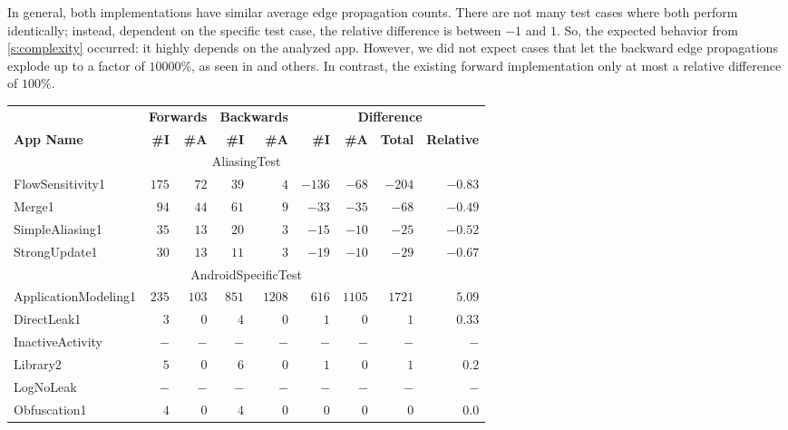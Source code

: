 \documentclass[../draft.tex]{subfiles}
\begin{document}
    In general, both implementations have similar average edge propagation counts. There are not many test cases where both perform identically; instead, dependent on the specific test case, the relative difference is between $-1$ and $1$. So, the expected behavior from \autoref{s:complexity} occurred: it highly depends on the analyzed app.
    However, we did not expect cases that let the backward edge propagations explode up to a factor of $10 000\%$, as seen in  and others. In contrast, the existing forward implementation only at most a relative difference of $100\%$.

    \footnotesize
    \newcommand{\tsubEight}[1]{\multicolumn{9}{c}{#1}\\\hline}
    \begin{longtable}{l | r | r | r | r | r | r | r | r}
        \centering
        & \multicolumn{2}{c|}{\textbf{Forwards}} & \multicolumn{2}{c|}{\textbf{Backwards}} & \multicolumn{4}{c}{\textbf{Difference}}\\
        \textbf{App Name} & \textbf{\#I} & \textbf{\#A} & \textbf{\#I} & \textbf{\#A} & \textbf{\#I} & \textbf{\#A}& \textbf{Total} & \textbf{Relative}\\
        \hline\hline
        \endhead
        \hline
        \tsubEight{AliasingTest}
        FlowSensitivity1 & $175$ & $72$ & $39$ & $4$ & $-136$ & $-68$ & $-204$ & $-0.83$\\
        Merge1 & $94$ & $44$ & $61$ & $9$ & $-33$ & $-35$ & $-68$ & $-0.49$\\
        SimpleAliasing1 & $35$ & $13$ & $20$ & $3$ & $-15$ & $-10$ & $-25$ & $-0.52$\\
        StrongUpdate1 & $30$ & $13$ & $11$ & $3$ & $-19$ & $-10$ & $-29$ & $-0.67$\\
        \hline
        \tsubEight{AndroidSpecificTest}
        ApplicationModeling1 & $235$ & $103$ & $851$ & $1208$ & $616$ & $1105$ & $1721$ & $5.09$\\
        DirectLeak1 & $3$ & $0$ & $4$ & $0$ & $1$ & $0$ & $1$ & $0.33$\\
        InactiveActivity & $-$ & $-$ & $-$ & $-$ & $-$ & $-$ & $-$ & $-$\\
        Library2 & $5$ & $0$ & $6$ & $0$ & $1$ & $0$ & $1$ & $0.2$\\
        LogNoLeak & $-$ & $-$ & $-$ & $-$ & $-$ & $-$ & $-$ & $-$\\
        Obfuscation1 & $4$ & $0$ & $4$ & $0$ & $0$ & $0$ & $0$ & $0.0$\\

\end{longtable}
\end{document}
